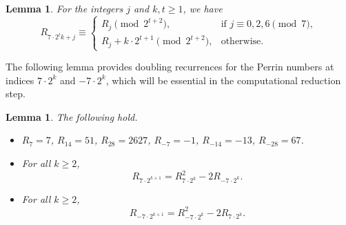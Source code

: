 \documentclass[11pt,a4paper]{article}
\newtheorem{lemma}[theorem]{Lemma}
\numberwithin{equation}{section}
\numberwithin{table}{section}
\numberwithin{figure}{section}
\begin{document}
\begin{lemma}\label{L5}
	For the integers $j$ and $k,t\ge 1$, we have
	$$
	R_{7\cdot 2^{t}k+j}\equiv\begin{cases}
		R_{j}\pmod{2^{t+2}}, & \text{if } j\equiv 0,2,6\pmod{7},\\
		R_{j}+k\cdot 2^{t+1}\pmod{2^{t+2}}, & \text{otherwise}.
	\end{cases}
	$$
\end{lemma}

The following lemma provides doubling recurrences for the 
Perrin numbers at indices $7\cdot 2^k$ and $-7\cdot 2^k$, 
which will be essential in the computational reduction step.

\begin{lemma}\label{lem:doubling}
	The following hold.
	\begin{itemize}
		\item[\rm(i)] $R_7 = 7$, $R_{14} = 51$, $R_{28} = 2627$, 
		$R_{-7} = -1$, $R_{-14} = -13$, $R_{-28} = 67$.
		\item[\rm(ii)] For all $k \ge 2$,
		\begin{equation*}
			R_{7\cdot 2^{k+1}} = R_{7\cdot 2^k}^2 - 2R_{-7\cdot 2^k}.
		\end{equation*}
		\item[\rm(iii)] For all $k \ge 2$,
		\begin{equation*}
			R_{-7\cdot 2^{k+1}} = R_{-7\cdot 2^k}^2 - 2R_{7\cdot 2^k}.
		\end{equation*}
	\end{itemize}
\end{lemma}
\end{document}

